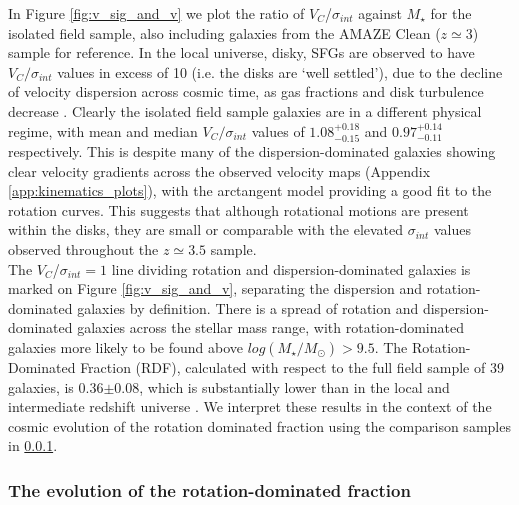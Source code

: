 \documentclass[fleqn,usenatbib]{mnras}
\begin{document}
In Figure \ref{fig:v_sig_and_v} we plot the ratio of $V_{C}$/$\sigma_{int}$ against $M_{\star}$ for the isolated field sample, also including galaxies from the AMAZE Clean ($z\simeq3$) sample for reference.
In the local universe, disky, SFGs are observed to have $V_{C}/\sigma_{int}$ values in excess of 10 (i.e. the disks are `well settled'), due to the decline of velocity dispersion across cosmic time, as gas fractions and disk turbulence decrease \citep[e.g.][]{Epinat2008a,Epinat2008}.
Clearly the isolated field sample galaxies are in a different physical regime, with mean and median $V_{C}/\sigma_{int}$ values of $1.08^{+0.18}_{-0.15}$ and $0.97^{+0.14}_{-0.11}$ respectively.
This is despite many of the dispersion-dominated galaxies showing clear velocity gradients across the observed velocity maps (Appendix \ref{app:kinematics_plots}), with the arctangent model providing a good fit to the rotation curves.
This suggests that although rotational motions are present within the disks, they are small or comparable with the elevated $\sigma_{int}$ values observed throughout the $z\simeq3.5$ sample. \\


The $V_{C}$/$\sigma_{int}=1$ line dividing rotation and dispersion-dominated galaxies is marked on Figure \ref{fig:v_sig_and_v}, separating the dispersion and rotation-dominated galaxies by definition.
There is a spread of rotation and dispersion-dominated galaxies across the stellar mass range, with rotation-dominated galaxies more likely to be found above $log(M_{\star}/M_{\odot}) > 9.5$.
The Rotation-Dominated Fraction (RDF), calculated with respect to the full field sample of 39 galaxies, is 0.36$\pm0.08$, which is substantially lower than in the local and intermediate redshift universe \citep[e.g.][]{Epinat2008a,Epinat2008,Green2014}.
We interpret these results in the context of the cosmic evolution of the rotation dominated fraction using the comparison samples in \cref{subsubsec:RDF_evolution}.\\

\subsubsection{The evolution of the rotation-dominated fraction}\label{subsubsec:RDF_evolution}
\end{document}

